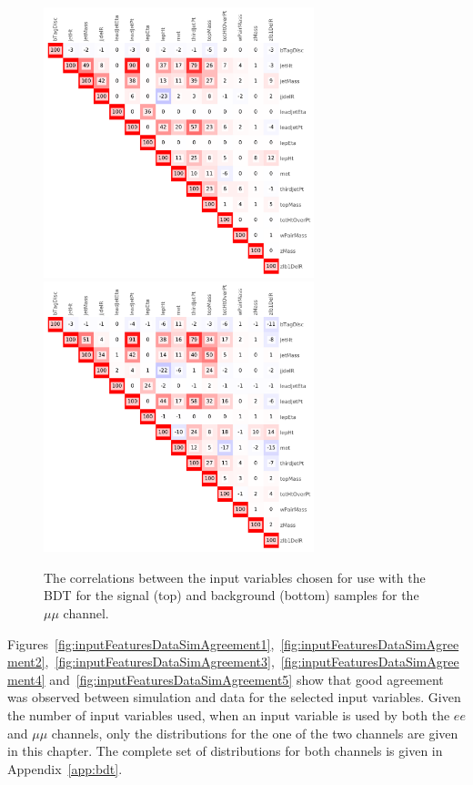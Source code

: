 \begin{figure}[h]
\centering
\includegraphics[width=0.7\textwidth]{figs/background-estimation/plots/corr_sig_mumu.pdf}
\\
\includegraphics[width=0.7\textwidth]{figs/background-estimation/plots/corr_bkg_mumu.pdf}
\caption{
The correlations between the input variables chosen for use with the BDT for the signal (top) and background (bottom) samples for the $\mu\mu$ channel.}
\label{fig:corr_mumu}
\end{figure}

Figures~\ref{fig:inputFeaturesDataSimAgreement1},~\ref{fig:inputFeaturesDataSimAgreement2},~\ref{fig:inputFeaturesDataSimAgreement3},~\ref{fig:inputFeaturesDataSimAgreement4} and~\ref{fig:inputFeaturesDataSimAgreement5} show that good agreement was observed between simulation and data for the selected input variables.
Given the number of input variables used, when an input variable is used by both the $ee$ and $\mu\mu$ channels, only the distributions for the one of the two channels are given in this chapter.
The complete set of distributions for both channels is given in Appendix~\ref{app:bdt}.

